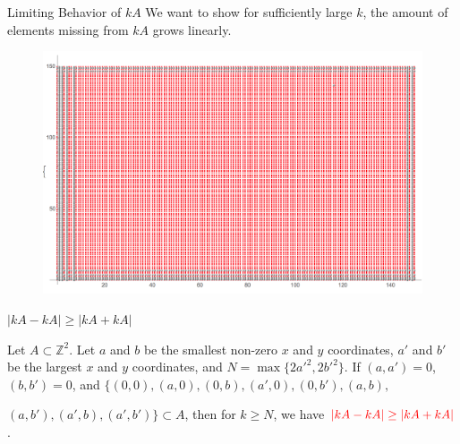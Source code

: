 \documentclass[11pt]{beamer}
\newcommand{\Z}{\mathbb{Z}}
\begin{document}
\begin{frame}{Limiting Behavior of $kA$}
We want to show for sufficiently large $k$, the amount of elements missing from $kA$ grows linearly.

\pause

\begin{figure}
    \centering
    \includegraphics[scale=.35]{stabilized_set.png}
    \label{fig:stablized set-1}
\end{figure}

\end{frame}


\begin{frame}{$|kA-kA| \geq |kA+kA|$}
\begin{theorem} \label{growth of kA-2}
Let $A \subset \Z^2$. Let $a$ and $b$ be the smallest non-zero $x$ and $y$ coordinates, $a'$ and $b'$ be the largest $x$ and $y$ coordinates, and $N=\max\{2a'^2, 2b'^2\}$. If $(a, a')=0$, $(b,b')=0$, and $\{(0,0), (a,0), (0,b), (a',0),(0,b'),(a,b),$

$(a,b'),(a',b), (a',b') \} \subset A$, then for $k \geq N$, we have $\color{red} |kA-kA| \geq |kA+kA|$. 
\end{theorem}


    
\end{frame}
\end{document}
